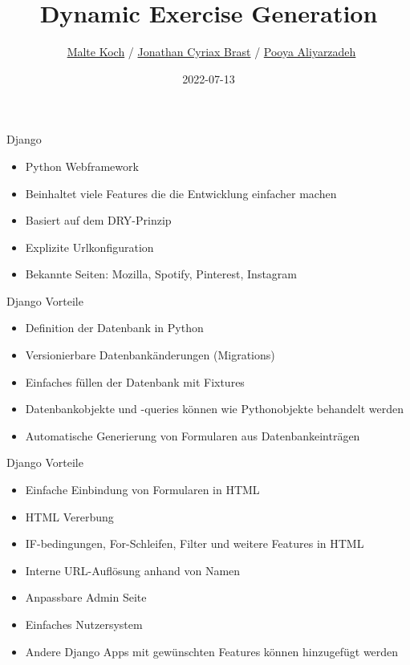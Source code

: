 \documentclass[english,hangout]{beamer}
\title{Dynamic Exercise Generation}
\subtitle{}
\author{\
  \href{mailto:malte.koch@stud.fra-uas.de}{Malte Koch} /
  \href{mailto:cyriax.brast@stud.fra-uas.de}{Jonathan Cyriax Brast} /
  \href{mailto:ooya.aliyarzadeh@gmail.com}{Pooya Aliyarzadeh}
}
\institute{Frankfurt University of Applied Sciences\\
           Faculty of Computer Science and Engineering}
\date{2022-07-13}
\begin{document}
\begin{frame}
\titlepage
\end{frame}

\begin{frame}{Django}
\begin{itemize}
 \item Python Webframework
 \item Beinhaltet viele Features die die Entwicklung einfacher machen
 \item Basiert auf dem DRY-Prinzip
 \item Explizite Urlkonfiguration
 \item Bekannte Seiten\footnotemark: Mozilla, Spotify, Pinterest, Instagram
\end{itemize}
\end{frame}

\begin{frame}{Django Vorteile}
\begin{itemize}
 \item Definition der Datenbank in Python
 \item Versionierbare Datenbankänderungen (Migrations)
 \item Einfaches füllen der Datenbank mit Fixtures
 \item Datenbankobjekte und -queries können wie Pythonobjekte behandelt werden
 \item Automatische Generierung von Formularen aus Datenbankeinträgen
\end{itemize}
\end{frame}

\begin{frame}{Django Vorteile}
\begin{itemize}
 \item Einfache Einbindung von Formularen in HTML
 \item HTML Vererbung
 \item IF-bedingungen, For-Schleifen, Filter und weitere Features in HTML
 \item Interne URL-Auflösung anhand von Namen
 \item Anpassbare Admin Seite
 \item Einfaches Nutzersystem
 \item Andere Django Apps mit gewünschten Features können hinzugefügt werden
\end{itemize}
\end{frame}
\end{document}
